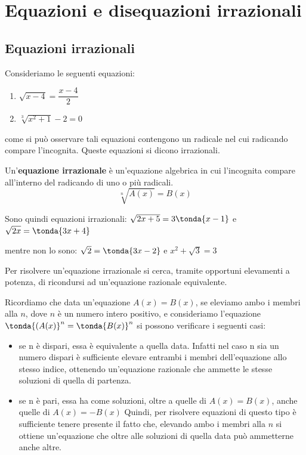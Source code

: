 \section{Equazioni e disequazioni irrazionali}
\label{sec:irvalass_irraz}

\subsection{Equazioni irrazionali}

Consideriamo le seguenti equazioni:
\begin{enumerate}
 \item \(\sqrt{x-4} = \dfrac{x-4}{2}\)
 \item \(\sqrt[3]{x^{2}+1} -2=0\)
\end{enumerate}

come si può osservare tali equazioni contengono un radicale nel cui radicando 
compare  l'incognita.
Queste equazioni si dicono irrazionali.

\begin{definizione}
 Un'\textbf{equazione irrazionale} è un'equazione algebrica in cui l'incognita 
compare all'interno del radicando di uno o più radicali.
\[\sqrt[n]{A(x)} = B(x)\]
\end{definizione}

Sono quindi equazioni irrazionali: 
\(\sqrt{2x+5} = 3\tonda{x-1}\) \quad e \quad \(\sqrt{2x} = \tonda{3x+4}\)  

mentre non lo sono: \(\sqrt{2} = \tonda{3x-2}\) \quad e \quad 
\(x^2 + \sqrt{3} = 3\) 

Per risolvere un'equazione irrazionale si cerca, tramite opportuni elevamenti a 
potenza, di ricondursi ad un'equazione razionale equivalente.

Ricordiamo che data un'equazione \(A(x)=B(x)\), se eleviamo ambo i membri alla 
\(n\), dove \(n\) è un numero intero positivo, e consideriamo l'equazione 
\(\tonda{(A(x)}^n=\tonda{B(x)}^n\) si possono verificare i seguenti casi:
\begin{itemize}
 \item 
 se n è dispari, essa è equivalente a quella data.
Infatti nel caso n sia un numero dispari è sufficiente elevare entrambi i 
membri 
dell'equazione allo stesso indice, ottenendo  un'equazione razionale che 
ammette 
le stesse soluzioni di quella di partenza.
 \item 
 se n è pari, essa ha come soluzioni, oltre a quelle di \(A(x)=B(x)\), anche 
quelle di \(A(x) = -B(x)\)
Quindi, per risolvere equazioni di questo tipo è sufficiente tenere presente il 
fatto che, elevando ambo i membri alla \(n\) si ottiene un'equazione che 
oltre alle soluzioni di quella data può ammetterne anche altre.
\end{itemize}

